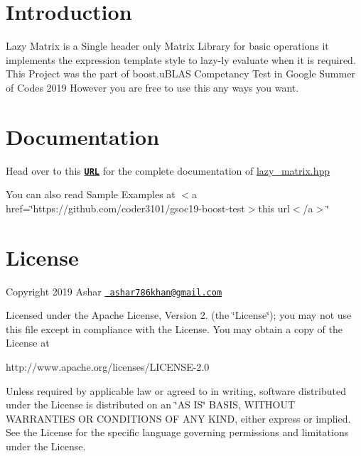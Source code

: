 \hypertarget{index_intro_sec}{}\section{Introduction}\label{index_intro_sec}
Lazy Matrix is a Single header only Matrix Library for basic operations it implements the expression template style to lazy-\/ly evaluate when it is required. This Project was the part of boost.\+u\+B\+L\+AS Competancy Test in Google Summer of Codes 2019 However you are free to use this any ways you want.\hypertarget{index_install_sec}{}\section{Documentation}\label{index_install_sec}
Head over to this \href{https://coder3101.github.io/gsoc19-boost-test/html/classboost_1_1test_1_1lazy__matrix.html}{\texttt{ {\bfseries{U\+RL}}}} for the complete documentation of {\ttfamily \mbox{\hyperlink{lazy__matrix_8hpp_source}{lazy\+\_\+matrix.\+hpp}}}

You can also read Sample Examples at $<$a href=\char`\"{}https\+://github.\+com/coder3101/gsoc19-\/boost-\/test$>$this url$<$/a$>$\char`\"{}\hypertarget{index_license}{}\section{License}\label{index_license}
Copyright 2019 Ashar \href{mailto:ashar786khan@gmail.com}{\texttt{ ashar786khan@gmail.\+com}}

Licensed under the Apache License, Version 2. (the \char`\"{}\+License\char`\"{}); you may not use this file except in compliance with the License. You may obtain a copy of the License at \begin{DoxyVerb}http://www.apache.org/licenses/LICENSE-2.0
\end{DoxyVerb}


Unless required by applicable law or agreed to in writing, software distributed under the License is distributed on an \char`\"{}\+A\+S I\+S\char`\"{} B\+A\+S\+IS, W\+I\+T\+H\+O\+UT W\+A\+R\+R\+A\+N\+T\+I\+ES OR C\+O\+N\+D\+I\+T\+I\+O\+NS OF A\+NY K\+I\+ND, either express or implied. See the License for the specific language governing permissions and limitations under the License. 